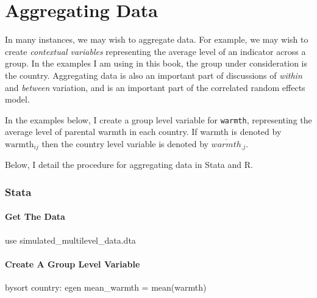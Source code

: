 \documentclass[
  letterpaper,
  DIV=11,
  numbers=noendperiod]{scrreprt}
\newenvironment{Shaded}{\begin{snugshade}}{\end{snugshade}}
\newcommand{\KeywordTok}[1]{\textcolor[rgb]{0.00,0.23,0.31}{#1}}
\newcommand{\NormalTok}[1]{\textcolor[rgb]{0.00,0.23,0.31}{#1}}
\begin{document}
\chapter{Aggregating Data}\label{aggregating-data}

In many instances, we may wish to aggregate data. For example, we may
wish to create \emph{contextual variables} representing the average
level of an indicator across a group. In the examples I am using in this
book, the group under consideration is the country. Aggregating data is
also an important part of discussions of \emph{within} and
\emph{between} variation, and is an important part of the correlated
random effects model.

In the examples below, I create a group level variable for
\texttt{warmth}, representing the average level of parental warmth in
each country. If warmth is denoted by \(\text{warmth}_{ij}\) then the
country level variable is denoted by \(\overline{warmth}_{.j}\).

Below, I detail the procedure for aggregating data in Stata and R.

\subsection{Stata}

\subsubsection{Get The Data}\label{get-the-data-8}

\begin{Shaded}
\begin{Highlighting}[]

\KeywordTok{use}\NormalTok{ simulated\_multilevel\_data.dta}
\end{Highlighting}
\end{Shaded}

\subsubsection{Create A Group Level
Variable}\label{create-a-group-level-variable}

\begin{Shaded}
\begin{Highlighting}[]

\KeywordTok{bysort}\NormalTok{ country: }\KeywordTok{egen}\NormalTok{ mean\_warmth = }\KeywordTok{mean}\NormalTok{(warmth)}
\end{Highlighting}
\end{Shaded}
\end{document}
